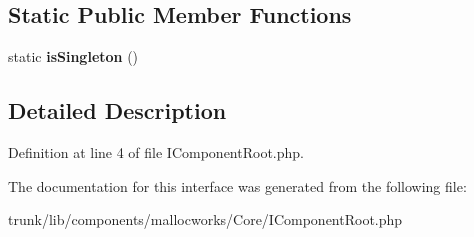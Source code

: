 \subsection*{Static Public Member Functions}
\begin{DoxyCompactItemize}
\item 
\hypertarget{interface_utopia_1_1_components_1_1_core_1_1_i_component_root_a27336ec50713d9bfc1ab062dc58f2ea9}{
static {\bfseries isSingleton} ()}
\label{interface_utopia_1_1_components_1_1_core_1_1_i_component_root_a27336ec50713d9bfc1ab062dc58f2ea9}

\end{DoxyCompactItemize}


\subsection{Detailed Description}


Definition at line 4 of file IComponentRoot.php.



The documentation for this interface was generated from the following file:\begin{DoxyCompactItemize}
\item 
trunk/lib/components/mallocworks/Core/IComponentRoot.php\end{DoxyCompactItemize}
